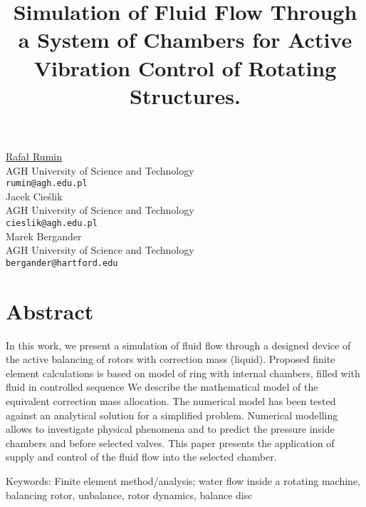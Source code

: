 \documentclass[article,A4,11pt]{llncs}%
\begin{document}
\title{Simulation of Fluid Flow Through a System of Chambers for Active Vibration Control of Rotating Structures.}
 \author{} \institute{}
\maketitle
\begin{center}
{\large \underline{Rafał Rumin}}\\
AGH University of Science and Technology\\
{\tt rumin@agh.edu.pl}
\\ \vspace{4mm}
{\large Jacek Cieślik}\\
AGH University of Science and Technology\\
{\tt cieslik@agh.edu.pl}
\\ \vspace{4mm}
{\large Marek Bergander}\\
AGH University of Science and Technology\\
{\tt bergander@hartford.edu}
\end{center}

\section*{Abstract}
In this work, we present a simulation of fluid flow through a designed device of the active balancing of rotors with correction mass (liquid). Proposed finite element calculations is based on model of ring with internal chambers, filled with fluid in controlled sequence We describe the mathematical model of the equivalent correction mass allocation.
The numerical model has been tested against an analytical solution for a simplified problem. Numerical modelling allows to investigate physical phenomena and to predict the pressure inside chambers and before selected valves. This paper presents the application of  supply and control of the fluid flow into the selected chamber. 

Keywords: Finite element method/analysis;   water flow inside a rotating machine, balancing rotor, unbalance, rotor dynamics, balance disc
\end{document}
